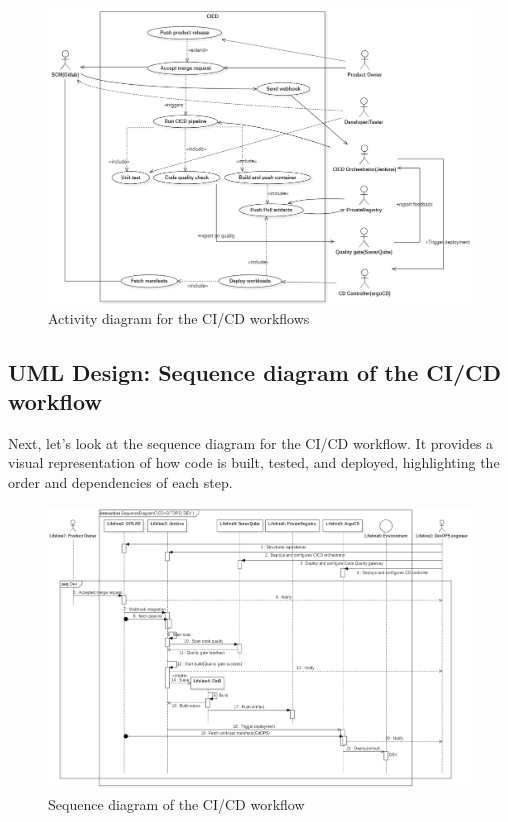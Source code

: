\begin{figure}[H]\centering
\includegraphics[width=1.0\textwidth,angle=00]{assets/f45.png}
\caption{ Activity diagram for the CI/CD workflows}
\label{fig:Activity diagram for the CI/CD workflows}
\end{figure}

\subsection{UML Design: Sequence diagram of the CI/CD workflow }

\hspace{7mm}Next, let’s look at the sequence diagram for the CI/CD workflow. It provides a visual representation of how code is built, tested, and deployed, highlighting the order and dependencies of each step.
\begin{figure}[H]\centering
\begin{sideways}
\includegraphics[height=1.0\textwidth,angle=00]{assets/f46.png}
\end{sideways}
\caption{ Sequence diagram of the CI/CD workflow}
\label{fig:sequence diagram of the CI/CD workflow}
\end{figure}


